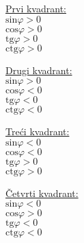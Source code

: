 \documentclass[10pt,oneside,a4paper]{report}
\begin{document}
\vspace{4mm}
\noindent
\begin{minipage}[b]{3cm}
\underline{Prvi kvadrant:}\\
\hspace*{5mm}$\textrm{sin}\varphi>0$\\
\hspace*{5mm}$\textrm{cos}\varphi>0$\\
\hspace*{5mm}$\textrm{tg}\varphi>0$\\
\hspace*{5mm}$\textrm{ctg}\varphi>0$\\
\vspace{1cm}
\end{minipage}
\hspace{7mm}
\begin{minipage}[b]{3cm}
\underline{Drugi kvadrant:}\\
\hspace*{5mm}$\textrm{sin}\varphi>0$\\
\hspace*{5mm}$\textrm{cos}\varphi<0$\\
\hspace*{5mm}$\textrm{tg}\varphi<0$\\
\hspace*{5mm}$\textrm{ctg}\varphi<0$\\
\vspace{1cm}
\end{minipage}

\vspace{7mm}
\noindent
\begin{minipage}[b]{3cm}
\underline{Tre\'{c}i kvadrant:}\\
\hspace*{5mm}$\textrm{sin}\varphi<0$\\
\hspace*{5mm}$\textrm{cos}\varphi<0$\\
\hspace*{5mm}$\textrm{tg}\varphi>0$\\
\hspace*{5mm}$\textrm{ctg}\varphi>0$\\
\vspace{1cm}
\end{minipage}
\hspace{7mm}
\begin{minipage}[b]{3cm}
\underline{\v{C}etvrti kvadrant:}\\
\hspace*{5mm}$\textrm{sin}\varphi<0$\\
\hspace*{5mm}$\textrm{cos}\varphi>0$\\
\hspace*{5mm}$\textrm{tg}\varphi<0$\\
\hspace*{5mm}$\textrm{ctg}\varphi<0$\\
\vspace{1cm}
\end{minipage}
\end{document}
